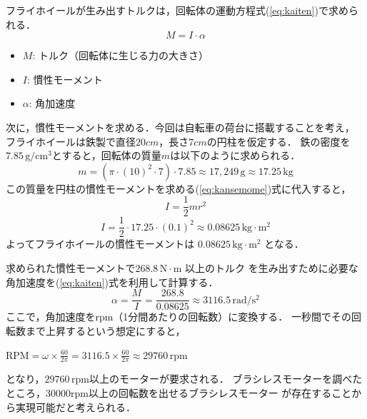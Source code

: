 \documentclass[uplatex,dvipdfmx]{jsarticle}
\begin{document}
フライホイールが生み出すトルクは，回転体の運動方程式(\ref{eq:kaiten})で求められる．
\begin{equation}
M = I \cdot \alpha
\label{eq:kaiten}
\end{equation}
\begin{itemize}
    \item \( M \): トルク（回転体に生じる力の大きさ）
    \item \( I \): 慣性モーメント
    \item \( \alpha \): 角加速度
\end{itemize}

次に，慣性モーメントを求める．今回は自転車の荷台に搭載することを考え，
フライホイールは鉄製で直径$20cm$，長さ$7cm$の円柱を仮定する．
鉄の密度を$7.85 \, \mathrm{g/cm^3}$とすると，回転体の質量$m$は以下のように求められる．
\[
m = \left( \pi \cdot (10)^2 \cdot 7 \right) \cdot 7.85 \approx 17,249 \, \mathrm{g} \approx 17.25 \, \mathrm{kg}
\]
この質量を円柱の慣性モーメントを求める(\ref{eq:kansemome})式に代入すると，
\begin{equation}
I = \frac{1}{2} m r^2
\label{eq:kansemome}
\end{equation}
\[
I = \frac{1}{2} \cdot 17.25 \cdot (0.1)^2 \approx 0.08625 \, \mathrm{kg \cdot m^2}
\]
よってフライホイールの慣性モーメントは \( 0.08625 \, \mathrm{kg \cdot m^2} \) となる．

求められた慣性モーメントで$ 268.8 \, \mathrm{N \cdot m} $ 以上のトルク
を生み出すために必要な角加速度を(\ref{eq:kaiten})式を利用して計算する．
\[
\alpha = \frac{M}{I} = \frac{268.8}{0.08625} \approx 3116.5 \, \mathrm{rad/s^2}
\]
ここで，角加速度をrpm（1分間あたりの回転数）に変換する．
一秒間でその回転数まで上昇するという想定にすると，


$\mathrm{RPM} = \omega \times \frac{60}{2\pi} = 3116.5 \times \frac{60}{2\pi} \approx 29760 \, \mathrm{rpm}$

となり，$29760 \, \mathrm{rpm}$以上のモーターが要求される．
ブラシレスモーターを調べたところ，$30000\mathrm{rpm}$以上の回転数を出せるブラシレスモーター
が存在することから実現可能だと考えられる．
\end{document}
